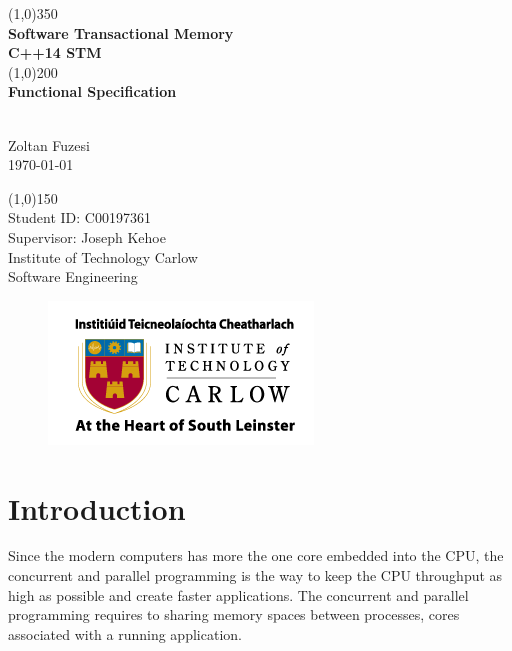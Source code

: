 \documentclass[12pt]{article}
\begin{document}
\begin{titlepage}
	\begin{center}
	\line(1,0){350}\\
	[0.3 cm]
	\huge{\textbf{Software Transactional Memory\\[0.3 cm]C++14 STM\\ }} 
	\line(1,0){200}\\
	[0.3 cm]
	\huge{\textbf{Functional Specification }} 
		\begin{LARGE}
		\\[0.3 cm]Zoltan Fuzesi\\
		\today
		\end{LARGE}
		
		\begin{LARGE}
		\line(1,0){150}\\
		[1.0 cm]
		Student ID: C00197361\\
		Supervisor: Joseph Kehoe\\
		\color{gray}Institute of Technology Carlow\\
		\color{gray}Software Engineering
		\end{LARGE}
		
\begin{figure}[h!]
\centering
\includegraphics[scale=0.7]{Pictures/carlow.png}

\end{figure}
		
	\end{center}
\end{titlepage}

\tableofcontents


\clearpage
{}
\setcounter{page}{1}
\section{Introduction}
Since the modern computers has more the one core embedded into the CPU, the concurrent and parallel programming is the way to keep the CPU throughput as high as possible and create faster applications. The concurrent and parallel programming requires to sharing memory spaces between processes, cores associated with a running application.\\
\end{document}
